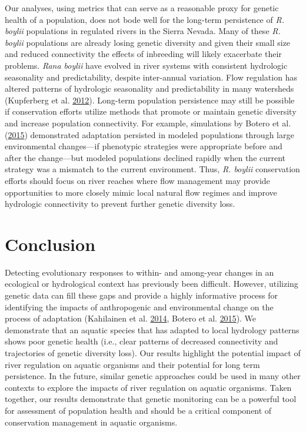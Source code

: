 \documentclass[proquest,12pt,final]{ucthesis-CA2012} %
\begin{document}
\begin{ucmainmatter}
Our analyses, using metrics that can serve as a reasonable proxy for
genetic health of a population, does not bode well for the long-term
persistence of \emph{R. boylii} populations in regulated rivers in the
Sierra Nevada. Many of these \emph{R. boylii} populations are already
losing genetic diversity and given their small size and reduced
connectivity the effects of inbreeding will likely exacerbate their
problems. \emph{Rana boylii} have evolved in river systems with
consistent hydrologic seasonality and predictability, despite
inter-annual variation. Flow regulation has altered patterns of
hydrologic seasonality and predictability in many watersheds (Kupferberg
et al. \protect\hyperlink{ref-kupferberg_effects_2012}{2012}). Long-term
population persistence may still be possible if conservation efforts
utilize methods that promote or maintain genetic diversity and increase
population connectivity. For example, simulations by Botero et al.
(\protect\hyperlink{ref-botero_evolutionary_2015}{2015}) demonstrated
adaptation persisted in modeled populations through large environmental
changes---if phenotypic strategies were appropriate before and after the
change---but modeled populations declined rapidly when the current
strategy was a mismatch to the current environment. Thus, \emph{R.
boylii} conservation efforts should focus on river reaches where flow
management may provide opportunities to more closely mimic local natural
flow regimes and improve hydrologic connectivity to prevent further
genetic diversity loss.

\hypertarget{conclusion}{%
\section{Conclusion}\label{conclusion}}

Detecting evolutionary responses to within- and among-year changes in an
ecological or hydrological context has previously been difficult.
However, utilizing genetic data can fill these gaps and provide a highly
informative process for identifying the impacts of anthropogenic and
environmental change on the process of adaptation (Kahilainen et al.
\protect\hyperlink{ref-kahilainen_conservation_2014}{2014}, Botero et
al. \protect\hyperlink{ref-botero_evolutionary_2015}{2015}). We
demonstrate that an aquatic species that has adapted to local hydrology
patterns shows poor genetic health (i.e., clear patterns of decreased
connectivity and trajectories of genetic diversity loss). Our results
highlight the potential impact of river regulation on aquatic organisms
and their potential for long term persistence. In the future, similar
genetic approaches could be used in many other contexts to explore the
impacts of river regulation on aquatic organisms. Taken together, our
results demonstrate that genetic monitoring can be a powerful tool for
assessment of population health and should be a critical component of
conservation management in aquatic organisms.


\end{ucmainmatter}
\end{document}
